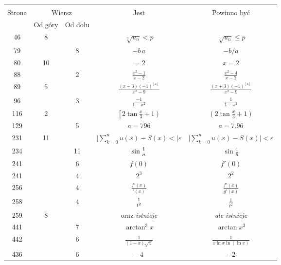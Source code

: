 \documentclass[a4paper,11pt]{article}
\begin{document}
\begin{center}

  \begin{tabular}{|c|c|c|c|c|}
    \hline
    & \multicolumn{2}{c|}{} & & \\
    Strona & \multicolumn{2}{c|}{Wiersz} & Jest
                              & Powinno być \\ \cline{2-3}
    & Od góry & Od dołu & & \\
    \hline
    46  &  8 & & $\sqrt[n]{ u_{ n } } < p$ & $\sqrt[n]{ u_{ n } } \leq p$ \\
    79  & &  8 & $-b \, a$ & $-b / a$ \\
    80  & 10 & & $= 2$ & $x = 2$ \\
    88  & &  2 & $\frac{ x^{ 2 } - 1 }{ x - 2 }$
           & $\frac{ x^{ 2 } - 4 }{ x - 2 }$ \\
    89  &  5 & & $\frac{ ( x - 3 )( -1 )^{ [ x ] } }{ x^{ 2 } - 9 }$
           & $\frac{ ( x + 3 )( -1 )^{ [ x ] } }{ x^{ 2 } - 9 }$ \\
    96  & &  3 & $\frac{ -1 }{ 1 - x^{ 2 } }$
           & $\frac{ 1 }{ 1 - x^{ 2 } }$ \\
    116 &  2 & & $\left[ 2 \tan \frac{ x }{ 3 } + 1 \right)$
           & $ \left( 2 \tan \frac{ x }{ 3 } + 1 \right)$ \\
    129 & &  5 & $a = 796$ & $a = 7.96$ \\
    231 & 11 & & $\bigg| \sum_{ k = 0 }^{ n } u( x ) - S( x ) < \bigg|
                 \varepsilon$
           & $\bigg| \sum_{ k = 0 }^{ n } u( x ) - S( x ) \bigg|
             < \varepsilon$ \\
    234 & & 11 & $\sin{ 1 \atop n }$ & $\sin \frac{ 1 }{ n }$ \\
    241 & &  6 & $f( 0 )$ & $f'( 0 )$ \\
    241 & &  4 & $2^{ 3 }$ & $2^{ 2 }$ \\
    256 & &  4 & $\frac{ f'( x ) }{ {}'( x ) }$
           & $\frac{ f'( x ) }{ g'( x ) }$ \\[0.4em]
    258 & &  4 & ${ 1 \atop t^{ 2 } }$ & $\frac{ 1 }{ t^{ 2 } }$ \\
    259 &  8 & & oraz \textit{istnieje} & \textit{ale istnieje} \\
    441 & &  7 & $\arctan^{ 3 }x$ & $\arctan x^{ 3 }$ \\
    442 & &  6 & $\frac{ 1 }{ ( 1 - x ) \sqrt{ x } }$
           & $\frac{ 1 }{ x \ln x \ln( \ln x ) }$ \\
    436 & &  6 & $-4$ & $-2$ \\
    \hline
  \end{tabular}

\end{center}
\end{document}
